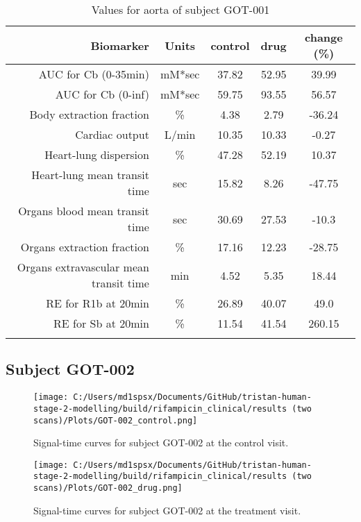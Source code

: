 \documentclass{epflreport}%
\begin{document}
\begin{longtable}{rcccc}%
\hline%
Biomarker&Units&control&drug&change (\%)\\%
\hline%
AUC for Cb (0{-}35min)&mM*sec&37.82&52.95&39.99\\%
AUC for Cb (0{-}inf)&mM*sec&59.75&93.55&56.57\\%
Body extraction fraction&\%&4.38&2.79&{-}36.24\\%
Cardiac output&L/min&10.35&10.33&{-}0.27\\%
Heart{-}lung dispersion&\%&47.28&52.19&10.37\\%
Heart{-}lung mean transit time&sec&15.82&8.26&{-}47.75\\%
Organs blood mean transit time&sec&30.69&27.53&{-}10.3\\%
Organs extraction fraction&\%&17.16&12.23&{-}28.75\\%
Organs extravascular mean transit time&min&4.52&5.35&18.44\\%
RE for R1b at 20min&\%&26.89&40.07&49.0\\%
RE for Sb at 20min&\%&11.54&41.54&260.15\\%
\hline%
\caption{Values for aorta of subject GOT-001} \\%
\end{longtable}%
\clearpage%
\subsection{Subject GOT{-}002}%
\label{subsec:SubjectGOT{-}002}%

%


\begin{figure}[h!]%
\centering%
\texttt{[image: C:/Users/md1spsx/Documents/GitHub/tristan-human-stage-2-modelling/build/rifampicin\_clinical/results (two scans)/Plots/GOT-002\_control.png]}%
\caption{Signal{-}time curves for subject GOT{-}002 at the control visit.}%
\end{figure}

%


\begin{figure}[h!]%
\centering%
\texttt{[image: C:/Users/md1spsx/Documents/GitHub/tristan-human-stage-2-modelling/build/rifampicin\_clinical/results (two scans)/Plots/GOT-002\_drug.png]}%
\caption{Signal{-}time curves for subject GOT{-}002 at the treatment visit.}%
\end{figure}
\end{document}
